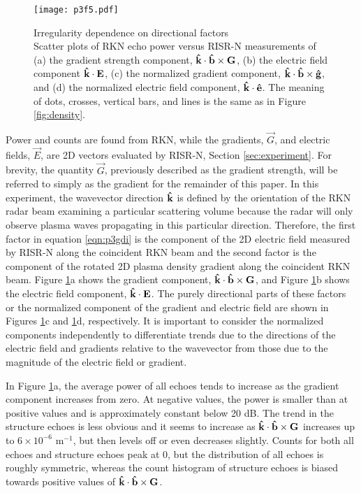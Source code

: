 \begin{figure}
	\texttt{[image: p3f5.pdf]}
  \caption[Irregularity dependence on directional factors]{{\:}Irregularity dependence on directional factors\\ Scatter plots of RKN echo power versus RISR-N measurements of (a) the gradient strength component, \(\mathbf{\hat{k}}\cdot\mathbf{\hat{b}}\times\mathbf{G}\), (b) the electric field component \(\mathbf{\hat{k}}\cdot\mathbf{E}\), (c) the normalized gradient component, \(\mathbf{\hat{k}}\cdot\mathbf{\hat{b}}\times\mathbf{\hat{g}}\), and (d) the normalized electric field component, \(\mathbf{\hat{k}}\cdot\mathbf{\hat{e}}\). The meaning of dots, crosses, vertical bars, and lines is the same as in Figure \ref{fig:density}.}
  \label{fig:directional}
\end{figure}

Power and counts are found from RKN, while the gradients, \(\vec{G}\), and electric fields, \(\vec{E}\), are 2D vectors evaluated by RISR-N, Section \ref{sec:experiment}. For brevity, the quantity \(\vec{G}\), previously described as the gradient strength, will be referred to simply as the gradient for the remainder of this paper.  In this experiment, the wavevector direction \(\mathbf{\hat{k}}\) is defined by the orientation of the RKN radar beam examining a particular scattering volume because the radar will only observe plasma waves propagating in this particular direction. Therefore, the first factor in equation \ref{eqn:p3gdi} is the component of the 2D electric field measured by RISR-N along the coincident RKN beam and the second factor is the component of the rotated 2D plasma density gradient along the coincident RKN beam.  Figure \ref{fig:directional}a shows the gradient component, \(\mathbf{\hat{k}}\cdot\mathbf{\hat{b}}\times\mathbf{G}\), and Figure \ref{fig:directional}b shows the electric field component, \(\mathbf{\hat{k}}\cdot\mathbf{E}\).  The purely directional parts of these factors or the normalized component of the gradient and electric field are shown in Figures \ref{fig:directional}c and \ref{fig:directional}d, respectively.  It is important to consider the normalized components independently to differentiate trends due to the directions of the electric field and gradients relative to the wavevector from those due to the magnitude of the electric field or gradient.

In Figure \ref{fig:directional}a, the average power of all echoes tends to increase as the gradient component increases from zero. At negative values, the power is smaller than at positive values and is approximately constant below 20 dB. The trend in the structure echoes is less obvious and it seems to increase as  \(\mathbf{\hat{k}}\cdot\mathbf{\hat{b}}\times\mathbf{G}\) increases up to \(6\times10^{-6}\) m\(^{-1}\), but then levels off or even decreases slightly.  Counts for both all echoes and structure echoes peak at 0, but the distribution of all echoes is roughly symmetric, whereas the count histogram of structure echoes is biased towards positive values of  \(\mathbf{\hat{k}}\cdot\mathbf{\hat{b}}\times\mathbf{G}\).

